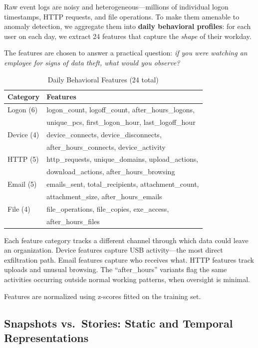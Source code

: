 \documentclass[conference]{IEEEtran}
\begin{document}
Raw event logs are noisy and heterogeneous---millions of individual logon timestamps, HTTP requests, and file operations. To make them amenable to anomaly detection, we aggregate them into \textbf{daily behavioral profiles}: for each user on each day, we extract 24 features that capture the \textit{shape} of their workday.

The features are chosen to answer a practical question: \textit{if you were watching an employee for signs of data theft, what would you observe?}

\begin{table}[htbp]
\caption{Daily Behavioral Features (24 total)}
\label{tab:features}
\centering
\small
\begin{tabular}{ll}
\toprule
\textbf{Category} & \textbf{Features} \\
\midrule
Logon (6) & logon\_count, logoff\_count, after\_hours\_logons, \\
          & unique\_pcs, first\_logon\_hour, last\_logoff\_hour \\
Device (4) & device\_connects, device\_disconnects, \\
           & after\_hours\_connects, device\_activity \\
HTTP (5) & http\_requests, unique\_domains, upload\_actions, \\
         & download\_actions, after\_hours\_browsing \\
Email (5) & emails\_sent, total\_recipients, attachment\_count, \\
          & attachment\_size, after\_hours\_emails \\
File (4) & file\_operations, file\_copies, exe\_access, \\
         & after\_hours\_files \\
\bottomrule
\end{tabular}
\end{table}

Each feature category tracks a different channel through which data could leave an organization. Device features capture USB activity---the most direct exfiltration path. Email features capture who receives what. HTTP features track uploads and unusual browsing. The ``after\_hours'' variants flag the same activities occurring outside normal working patterns, when oversight is minimal.

Features are normalized using z-scores fitted on the training set.

\subsection{Snapshots vs.\ Stories: Static and Temporal Representations}
\end{document}
